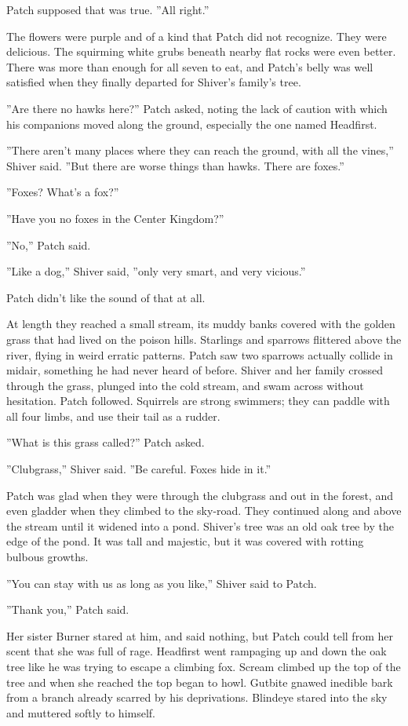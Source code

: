 \documentclass[12pt]{book}
\begin{document}
 Patch supposed that was true. ''All right.''\par
 The flowers were purple and of a kind that Patch did not recognize. They were delicious. The squirming white grubs beneath nearby flat rocks were even better. There was more than enough for all seven to eat, and Patch's belly was well satisfied when they finally departed for Shiver's family's tree.\par
 ''Are there no hawks here?'' Patch asked, noting the lack of caution with which his companions moved along the ground, especially the one named Headfirst. \par
 ''There aren't many places where they can reach the ground, with all the vines,'' Shiver said. ''But there are worse things than hawks. There are foxes.''\par
 ''Foxes? What's a fox?''\par
 ''Have you no foxes in the Center Kingdom?''\par
 ''No,'' Patch said.\par
 ''Like a dog,'' Shiver said, ''only very smart, and very vicious.''\par
 Patch didn't like the sound of that at all.\par
 At length they reached a small stream, its muddy banks covered with the golden grass that had lived on the poison hills. Starlings and sparrows flittered above the river, flying in weird erratic patterns. Patch saw two sparrows actually collide in midair, something he had never heard of before. Shiver and her family crossed through the grass, plunged into the cold stream, and swam across without hesitation. Patch followed. Squirrels are strong swimmers; they can paddle with all four limbs, and use their tail as a rudder.\par
 ''What is this grass called?'' Patch asked.\par
 ''Clubgrass,'' Shiver said. ''Be careful. Foxes hide in it.''\par
 Patch was glad when they were through the clubgrass and out in the forest, and even gladder when they climbed to the sky-road. They continued along and above the stream until it widened into a pond. Shiver's tree was an old oak tree by the edge of the pond. It was tall and majestic, but it was covered with rotting bulbous growths.\par
 ''You can stay with us as long as you like,'' Shiver said to Patch.\par
 ''Thank you,'' Patch said.\par
 Her sister Burner stared at him, and said nothing, but Patch could tell from her scent that she was full of rage. Headfirst went rampaging up and down the oak tree like he was trying to escape a climbing fox. Scream climbed up the top of the tree and when she reached the top began to howl. Gutbite gnawed inedible bark from a branch already scarred by his deprivations. Blindeye stared into the sky and muttered softly to himself.\par
\end{document}
